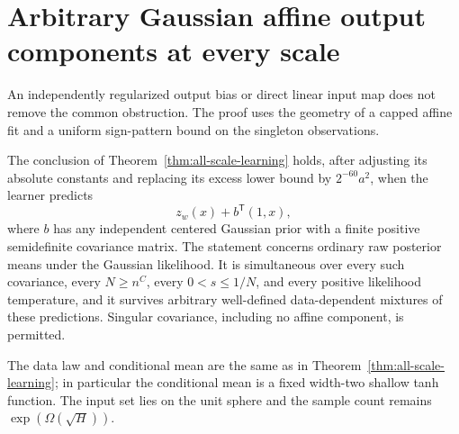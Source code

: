 \section{Arbitrary Gaussian affine output components at every scale}
\label{sec:all-scale-affine-likelihood}
An independently regularized output bias or direct linear input map does not remove the common obstruction. The proof uses the geometry of a capped affine fit and a uniform sign-pattern bound on the singleton observations.

\begin{theorem}
\label{thm:all-scale-affine-likelihood}
The conclusion of Theorem~\ref{thm:all-scale-learning} holds, after adjusting its absolute constants and replacing its excess lower bound by $2^{-60}a^2$, when the learner predicts
\[
 z_w(x)+b^{\mathsf T}(1,x),
\]
where $b$ has any independent centered Gaussian prior with a finite positive semidefinite covariance matrix. The statement concerns ordinary raw posterior means under the Gaussian likelihood. It is simultaneous over every such covariance, every $N\ge n^C$, every $0<s\le1/N$, and every positive likelihood temperature, and it survives arbitrary well-defined data-dependent mixtures of these predictions. Singular covariance, including no affine component, is permitted.

The data law and conditional mean are the same as in Theorem~\ref{thm:all-scale-learning}; in particular the conditional mean is a fixed width-two shallow tanh function. The input set lies on the unit sphere and the sample count remains $\exp(\Omega(\sqrt H))$.
\end{theorem}


